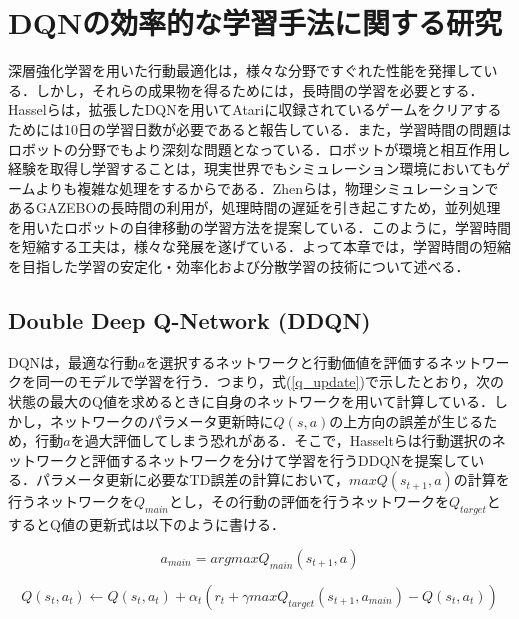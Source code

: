 \documentclass[12pt]{sonota/aislab}
\begin{document}
\section{DQNの効率的な学習手法に関する研究}\label{DQNの問題}
深層強化学習を用いた行動最適化は，様々な分野ですぐれた性能を発揮している．しかし，それらの成果物を得るためには，長時間の学習を必要とする．Hasselらは，拡張したDQNを用いてAtariに収録されているゲームをクリアするためには10日の学習日数が必要であると報告している\cite{rainbow}．また，学習時間の問題はロボットの分野でもより深刻な問題となっている．ロボットが環境と相互作用し経験を取得し学習することは，現実世界でもシミュレーション環境においてもゲームよりも複雑な処理をするからである．Zhenらは，物理シミュレーションであるGAZEBO\cite{GAZEBO}の長時間の利用が，処理時間の遅延を引き起こすため，並列処理を用いたロボットの自律移動の学習方法を提案している\cite{pararell}．このように，学習時間を短縮する工夫は，様々な発展を遂げている．よって本章では，学習時間の短縮を目指した学習の安定化・効率化および分散学習の技術について述べる．

\subsection{Double Deep Q-Network (DDQN)}
DQNは，最適な行動$a$を選択するネットワークと行動価値を評価するネットワークを同一のモデルで学習を行う．つまり，式(\ref{q_update})で示したとおり，次の状態の最大のQ値を求めるときに自身のネットワークを用いて計算している．しかし，ネットワークのパラメータ更新時に$Q(s,a)$の上方向の誤差が生じるため，行動$a$を過大評価してしまう恐れがある．そこで，Hasseltらは行動選択のネットワークと評価するネットワークを分けて学習を行うDDQNを提案している\cite{double}．パラメータ更新に必要なTD誤差の計算において，$maxQ(s_{t+1},a)$の計算を行うネットワークを$Q_{main}$とし，その行動の評価を行うネットワークを$Q_{target}$とするとQ値の更新式は以下のように書ける．

\begin{equation}
\label{a_main}
a_{main}=argmaxQ_{main}(s_{t+1},a)
\end{equation}

\begin{equation}
\label{double_q_update}
Q(s_{t},a_{t} )←Q(s_{t},a_{t} )+ α_{t} (r_{t}+ \gamma maxQ_{target}(s_{t+1},a_{main})-Q(s_{t},a_{t}))
\end{equation}
\end{document}
